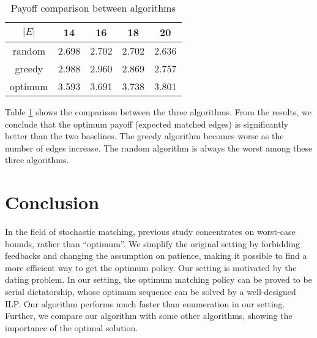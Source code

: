 \documentclass[letterpaper]{article}
\begin{document}
\begin{table}
	\caption{Payoff comparison between algorithms}
	\label{tab3}
	\tiny
	\centering
	\begin{tabular}{c|cccc}
		\hline
		$|E|$ & 14  & 16 & 18 & 20\\ \hline
		random& 2.698& 2.702 & 2.702 & 2.636\\
		greedy & 2.988& 2.960& 2.869& 2.757\\
		optimum & 3.593 & 3.691 & 3.738 & 3.801\\ \hline
	\end{tabular}
\end{table}

Table \ref{tab3} shows the comparison between the three algorithms. 
From the results, we conclude that the optimum payoff (expected matched edges) is significantly better than the two baselines.
The greedy algorithm becomes worse as the number of edges increase.
The random algorithm is always the worst among these three algorithms.
\section{Conclusion}
In the field of stochastic matching, previous study concentrates on worst-case bounds, rather than ``optimum''.
We simplify the original setting by forbidding feedbacks and changing the assumption on patience, making it possible to find a more efficient way to get the optimum policy.
Our setting is motivated by the dating problem.
In our setting, the optimum matching policy can be proved to be serial dictatorship, whose optimum sequence can be solved by a well-designed ILP.
Our algorithm performs much faster than enumeration in our setting.
Further, we compare our algorithm with some other algorithms, showing the importance of the optimal solution.

\newpage


\end{document}

